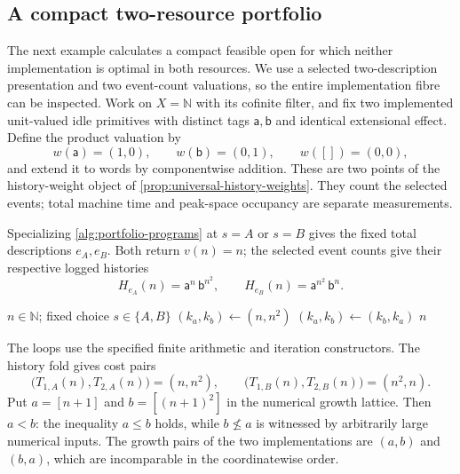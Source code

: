 \documentclass[11pt,a4paper]{article}
\numberwithin{algorithm}{section}
\numberwithin{equation}{section}
\theoremstyle{definition}
\theoremstyle{remark}
\theoremstyle{plain}
\newcommand{\N}{\mathbb N}
\theoremstyle{definition}
\theoremstyle{plain}
\begin{document}
\subsection{A compact two-resource portfolio}
\label{app:complexity-portfolio-example}

The next example calculates a compact feasible open for which neither
implementation is optimal in both resources. We use a selected
two-description presentation and two event-count valuations, so the
entire implementation fibre can be inspected.
Work on $X=\N$ with its cofinite filter, and fix two implemented
unit-valued idle primitives with distinct tags $\mathsf a,\mathsf b$
and identical extensional effect. Define the product valuation by
\[
 w(\mathsf a)=(1,0),\qquad
 w(\mathsf b)=(0,1),\qquad w([])=(0,0),
\]
and extend it to words by componentwise addition. These are two
points of the history-weight object of
\cref{prop:universal-history-weights}. They count the selected
events; total machine time and peak-space occupancy are separate
measurements.

Specializing \cref{alg:portfolio-programs} at $s=A$ or $s=B$ gives
the fixed total descriptions $e_A,e_B$. Both return $v(n)=n$;
the selected event counts give their respective logged histories
\begin{equation}\label{eq:app-portfolio-histories}
 H_{e_A}(n)=\mathsf a^{n}\,\mathsf b^{n^2},\qquad
 H_{e_B}(n)=\mathsf a^{n^2}\,\mathsf b^{n}.
\end{equation}
\begin{algorithm}[H]
\caption{The two-description resource portfolio}\label{alg:portfolio-programs}
\small
\begin{algorithmic}[1]
\Require $n\in\N$; fixed choice $s\in\{A,B\}$
\State $(k_a,k_b)\gets(n,n^2)$
  \State $(k_a,k_b)\gets(k_b,k_a)$
\EndIf
{}
  \State {}
\EndFor
{}
  \State {}
\EndFor
\State \Return $n$
\end{algorithmic}
\end{algorithm}
The loops use the specified finite arithmetic and iteration
constructors. The history fold gives cost pairs
\[
 \bigl(T_{1,A}(n),T_{2,A}(n)\bigr)=(n,n^2),\qquad
 \bigl(T_{1,B}(n),T_{2,B}(n)\bigr)=(n^2,n).
\]
Put $a=[n+1]$ and $b=[(n+1)^2]$ in the numerical growth lattice.
Then $a<b$: the inequality $a\le b$ holds, while $b\not\le a$
is witnessed by arbitrarily large numerical inputs.
The growth pairs of the two implementations are $(a,b)$ and $(b,a)$,
which are incomparable in the coordinatewise order.
\end{document}
